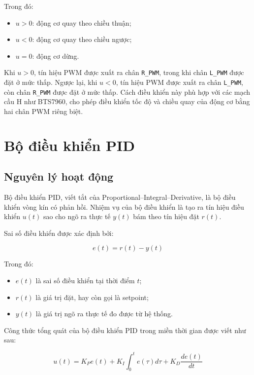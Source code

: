 Trong đó:
\begin{itemize}
    \item $u > 0$: động cơ quay theo chiều thuận;
    \item $u < 0$: động cơ quay theo chiều ngược;
    \item $u = 0$: động cơ dừng.
\end{itemize}

Khi $u > 0$, tín hiệu PWM được xuất ra chân \texttt{R\_PWM}, trong khi chân \texttt{L\_PWM} được đặt ở mức thấp. Ngược lại, khi $u < 0$, tín hiệu PWM được xuất ra chân \texttt{L\_PWM}, còn chân \texttt{R\_PWM} được đặt ở mức thấp. Cách điều khiển này phù hợp với các mạch cầu H như BTS7960, cho phép điều khiển tốc độ và chiều quay của động cơ bằng hai chân PWM riêng biệt.


\section{Bộ điều khiển PID}

\subsection{Nguyên lý hoạt động}

Bộ điều khiển PID, viết tắt của Proportional--Integral--Derivative, là bộ điều khiển vòng kín có phản hồi. Nhiệm vụ của bộ điều khiển là tạo ra tín hiệu điều khiển $u(t)$ sao cho ngõ ra thực tế $y(t)$ bám theo tín hiệu đặt $r(t)$.

Sai số điều khiển được xác định bởi:

\begin{equation}
    e(t) = r(t) - y(t)
\end{equation}

Trong đó:
\begin{itemize}
    \item $e(t)$ là sai số điều khiển tại thời điểm $t$;
    \item $r(t)$ là giá trị đặt, hay còn gọi là setpoint;
    \item $y(t)$ là giá trị ngõ ra thực tế đo được từ hệ thống.
\end{itemize}

Công thức tổng quát của bộ điều khiển PID trong miền thời gian được viết như sau:

\begin{equation}
    u(t) = K_P e(t) + K_I \int_{0}^{t} e(\tau)d\tau + K_D \frac{d e(t)}{dt}
    \label{eq:pid_general}
\end{equation}

